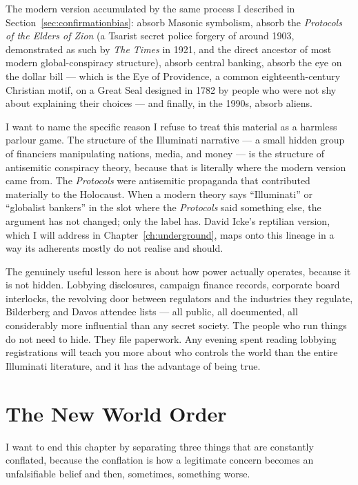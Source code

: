 The modern version accumulated by the same process I described in Section~\ref{sec:confirmationbias}: absorb Masonic
symbolism, absorb the \emph{Protocols of the Elders of Zion} (a Tsarist secret police forgery
of around 1903, demonstrated as such by \emph{The Times} in 1921, and the direct ancestor of
most modern global-conspiracy structure), absorb central banking, absorb the eye on the dollar
bill --- which is the Eye of Providence, a common eighteenth-century Christian motif, on a
Great Seal designed in 1782 by people who were not shy about explaining their choices --- and
finally, in the 1990s, absorb aliens.

I want to name the specific reason I refuse to treat this material as a harmless parlour game.
The structure of the Illuminati narrative --- a small hidden group of financiers manipulating
nations, media, and money --- is the structure of antisemitic conspiracy theory, because that is
literally where the modern version came from. The \emph{Protocols} were antisemitic propaganda
that contributed materially to the Holocaust. When a modern theory says ``Illuminati'' or
``globalist bankers'' in the slot where the \emph{Protocols} said something else, the argument
has not changed; only the label has. David Icke's reptilian version, which I will address in
Chapter~\ref{ch:underground}, maps onto this lineage in a way its adherents mostly do not
realise and should.

\begin{funfact}
The genuinely useful lesson here is about how power actually operates, because it is not
hidden. Lobbying disclosures, campaign finance records, corporate board interlocks, the
revolving door between regulators and the industries they regulate, Bilderberg and Davos
attendee lists --- all public, all documented, all considerably more influential than any
secret society. The people who run things do not need to hide. They file paperwork. Any evening
spent reading lobbying registrations will teach you more about who controls the world than the
entire Illuminati literature, and it has the advantage of being true.
\end{funfact}

\section{The New World Order}\label{sec:newworldorder}

I want to end this chapter by separating three things that are constantly conflated, because the
conflation is how a legitimate concern becomes an unfalsifiable belief and then, sometimes,
something worse.

